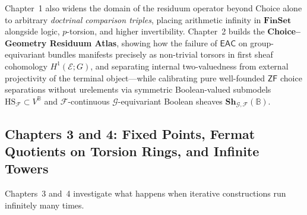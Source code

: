 \documentclass[10pt,twoside,openright]{book}
\theoremstyle{crmplain}
\theoremstyle{crmdef}
\theoremstyle{crmremark}
\begin{document}
Chapter~1 also widens the domain of the residuum operator beyond Choice alone to arbitrary \emph{doctrinal comparison triples}, placing arithmetic infinity in $\mathbf{FinSet}$ alongside logic, $p$-torsion, and higher invertibility. Chapter~2 builds the \textbf{Choice--Geometry Residuum Atlas}, showing how the failure of $\mathsf{EAC}$ on group-equivariant bundles manifests precisely as non-trivial torsors in first sheaf cohomology $H^1(\mathcal{E}; G)$, and separating internal two-valuedness from external projectivity of the terminal object---while calibrating pure well-founded $\mathsf{ZF}$ choice separations without urelements via symmetric Boolean-valued submodels $\mathrm{HS}_{\mathcal{F}} \subset V^{\mathbb{B}}$ and $\mathcal{F}$-continuous $\mathcal{G}$-equivariant Boolean sheaves $\mathbf{Sh}_{\mathcal{G}, \mathcal{F}}(\mathbb{B})$.

\subsection*{Chapters 3 and 4: Fixed Points, Fermat Quotients on Torsion Rings, and Infinite Towers}

Chapters~3 and~4 investigate what happens when iterative constructions run infinitely many times.
\end{document}
